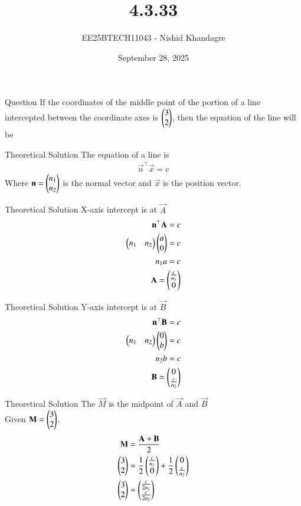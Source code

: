 \documentclass{beamer}
\title
{4.3.33}
\date{September 28, 2025}
\author
{EE25BTECH11043 - Nishid Khandagre}
\begin{document}
\frame{\titlepage}

\begin{frame}{Question}
If the coordinates of the middle point of the portion of a line intercepted between the coordinate axes is $\begin{pmatrix}3\\2\end{pmatrix}$, then the equation of the line will be
\end{frame}

\begin{frame}{Theoretical Solution}
The equation of a line is
\begin{align}
\vec{n}^\top\vec{x} = c
\end{align}
Where $\mathbf{n} = \begin{pmatrix}n_1 \\ n_2\end{pmatrix}$ is the normal vector and $\vec{x}$ is the position vector.
\end{frame}

\begin{frame}{Theoretical Solution}
X-axis intercept is at $\vec{A}$
\begin{align}
\mathbf{n}^\top\mathbf{A}=c\\
\begin{pmatrix}n_1&n_2\end{pmatrix}\begin{pmatrix}a\\0\end{pmatrix}=c\\
n_1a=c\\
\mathbf{A}=\begin{pmatrix}\frac{c}{n_1}\\0\end{pmatrix}
\end{align}
\end{frame}

\begin{frame}{Theoretical Solution}
Y-axis intercept is at $\vec{B}$
\begin{align}
\mathbf{n}^\top\mathbf{B}=c\\
\begin{pmatrix}n_1&n_2\end{pmatrix}\begin{pmatrix}0\\b\end{pmatrix}=c\\
n_2b=c\\
\mathbf{B}=\begin{pmatrix}0\\\frac{c}{n_2}\end{pmatrix}
\end{align}
\end{frame}
\begin{frame}{Theoretical Solution}
The $\vec{M}$ is the midpoint of $\vec{A}$ and $\vec{B}$\\
Given $\mathbf{M} = \begin{pmatrix}3 \\ 2\end{pmatrix}$.
\begin{align}
\mathbf{M} &= \frac{\mathbf{A} + \mathbf{B}}{2} \\
\begin{pmatrix}3\\2\end{pmatrix}&= \frac{1}{2} \begin{pmatrix}\frac{c}{n_1} \\ 0\end{pmatrix} + \frac{1}{2}\begin{pmatrix}0 \\ \frac{c}{n_2}\end{pmatrix}\\
\begin{pmatrix}3\\2\end{pmatrix}&= \begin{pmatrix}\frac{c}{2n_1} \\ \frac{c}{2n_2}\end{pmatrix}
\end{align}
\end{frame}
\end{document}
